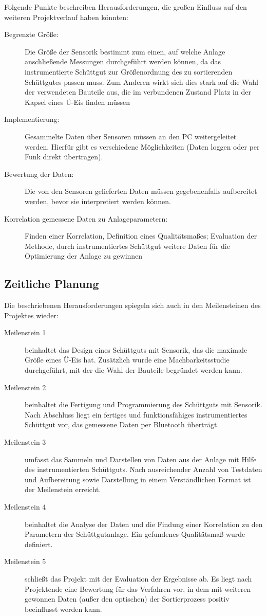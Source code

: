 Folgende Punkte beschreiben Herausforderungen, die großen Einfluss auf den weiteren Projektverlauf haben könnten:
\begin{description}
	\item [Begrenzte Größe:] Die Größe der Sensorik bestimmt zum einen, auf welche Anlage anschließende Messungen durchgeführt werden können, da das instrumentierte Schüttgut zur Größenordnung des zu sortierenden Schüttgutes passen muss. Zum Anderen wirkt sich dies stark auf die Wahl der verwendeten Bauteile aus, die im verbundenen Zustand Platz in der Kapsel eines Ü-Eis finden müssen
	\item [Implementierung:] Gesammelte Daten über Sensoren müssen an den PC weitergeleitet werden. Hierfür gibt es verschiedene Möglichkeiten (Daten loggen oder per Funk direkt übertragen).
	\item [Bewertung der Daten:] Die von den Sensoren gelieferten Daten müssen gegebenenfalls aufbereitet werden, bevor sie interpretiert werden können.
	\item [Korrelation gemessene Daten zu Anlageparametern:] Finden einer Korrelation, Definition eines Qualitätsmaßes; Evaluation der Methode, durch instrumentiertes Schüttgut weitere Daten für die Optimierung der Anlage zu gewinnen 
\end{description} 

\subsection{Zeitliche Planung}
Die beschriebenen Herausforderungen spiegeln sich auch in den Meilensteinen des Projektes wieder:
\begin{description}
	\item [Meilenstein 1] beinhaltet das Design eines Schüttguts mit Sensorik, das die maximale Größe eines Ü-Eis hat. Zusätzlich wurde eine Machbarkeitsstudie durchgeführt, mit der die Wahl der Bauteile begründet werden kann.
	\item [Meilenstein 2] beinhaltet die Fertigung und Programmierung des Schüttguts mit Sensorik. Nach Abschluss liegt ein fertiges und funktionsfähiges instrumentiertes Schüttgut vor, das gemessene Daten per Bluetooth überträgt.
	\item [Meilenstein 3] umfasst das Sammeln und Darstellen von Daten aus der Anlage mit Hilfe des instrumentierten Schüttguts. Nach ausreichender Anzahl von Testdaten und Aufbereitung sowie Darstellung in einem Verständlichen Format ist der Meilenstein erreicht.
	\item [Meilenstein 4] beinhaltet die Analyse der Daten und die Findung einer Korrelation zu den Parametern der Schüttgutanlage. Ein gefundenes Qualitätsmaß wurde definiert.
	\item [Meilenstein 5] schließt das Projekt mit der Evaluation der Ergebnisse ab. Es liegt nach Projektende eine Bewertung für das Verfahren vor, in dem mit  weiteren gewonnen Daten (außer den optischen) der Sortierprozess positiv beeinflusst werden kann.
\end{description}
	
